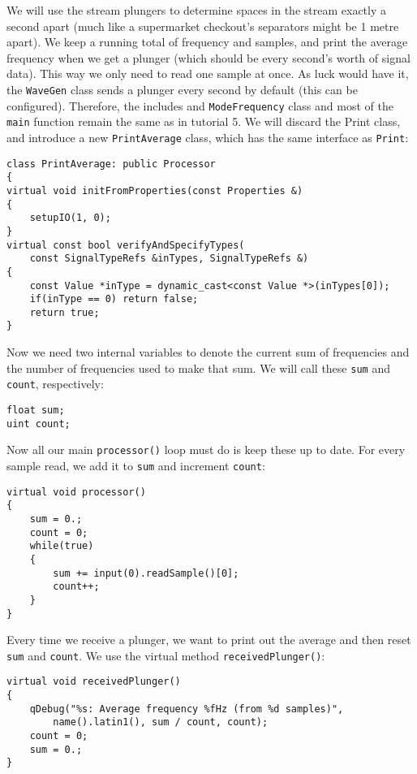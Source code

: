 We will use the stream plungers to determine spaces in the stream exactly a second apart (much like a supermarket checkout's separators might be 1 metre apart). We keep a running total of frequency and samples, and print the average frequency when we get a plunger (which should be every second's worth of signal data). This way we only need to read one sample at once. As luck would have it, the \texttt{WaveGen} class sends a plunger every second by default (this can be configured). Therefore, the includes and \texttt{ModeFrequency} class and most of the \texttt{main} function remain the same as in tutorial 5. We will discard the Print class, and introduce a new \texttt{PrintAverage} class, which has the same interface as \texttt{Print}:

\begin{verbatim}
class PrintAverage: public Processor
{
virtual void initFromProperties(const Properties &)
{
    setupIO(1, 0);
}
virtual const bool verifyAndSpecifyTypes(
    const SignalTypeRefs &inTypes, SignalTypeRefs &)
{
    const Value *inType = dynamic_cast<const Value *>(inTypes[0]);
    if(inType == 0) return false;
    return true;
}
\end{verbatim}

Now we need two internal variables to denote the current sum of frequencies and the number of frequencies used to make that sum. We will call these \texttt{sum} and \texttt{count}, respectively:

\begin{verbatim}
float sum;
uint count;
\end{verbatim}

Now all our main \texttt{processor()} loop must do is keep these up to date. For every sample read, we add it to \texttt{sum} and increment \texttt{count}:

\begin{verbatim}
virtual void processor()
{
    sum = 0.;
    count = 0;
    while(true)
    {
        sum += input(0).readSample()[0];
        count++;
    }
}
\end{verbatim}

Every time we receive a plunger, we want to print out the average and then reset \texttt{sum} and \texttt{count}. We use the virtual method \texttt{receivedPlunger()}:

\begin{verbatim}
virtual void receivedPlunger()
{
    qDebug("%s: Average frequency %fHz (from %d samples)",
        name().latin1(), sum / count, count);
    count = 0;
    sum = 0.;
}
\end{verbatim}

